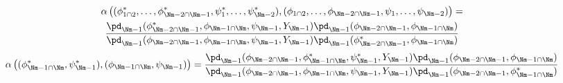 \begin{multline}
  \alpha\left(
    (\phi_{1 \cap 2}^{*}, \ldots, \phi_{\Nm - 2 \cap \Nm - 1}^{*}, \psi_{1}^{*}, \ldots, \psi_{\Nm - 2}^{*}),
    (\phi_{1 \cap 2}, \ldots, \phi_{\Nm - 2 \cap \Nm - 1}, \psi_{1}, \ldots, \psi_{\Nm - 2})
  \right)
  = \\
  \frac {
    \pd_{\Nm - 1}(\phi_{\Nm - 2 \cap \Nm - 1}^{*}, \phi_{\Nm - 1 \cap \Nm}, \psi_{\Nm - 1}, Y_{\Nm - 1})
    \pd_{\Nm - 1}(\phi_{\Nm - 2 \cap \Nm - 1}, \phi_{\Nm - 1 \cap \Nm})
  } {
    \pd_{\Nm - 1}(\phi_{\Nm - 2 \cap \Nm - 1}, \phi_{\Nm - 1 \cap \Nm}, \psi_{\Nm - 1}, Y_{\Nm - 1})
    \pd_{\Nm - 1}(\phi_{\Nm - 2 \cap \Nm - 1}^{*}, \phi_{\Nm - 1 \cap \Nm})
  } 
  \end{multline}
  \begin{multline}
  \alpha\left(
    (\phi_{\Nm - 1 \cap \Nm}^{*}, \psi_{\Nm - 1}^{*}),
    (\phi_{\Nm - 1 \cap \Nm}, \psi_{\Nm - 1})
  \right)
  = 
  \frac {
    \pd_{\Nm - 1}(\phi_{\Nm - 2 \cap \Nm - 1}, \phi_{\Nm - 1 \cap \Nm}^{*}, \psi_{\Nm - 1}^{*}, Y_{\Nm - 1})
    \pd_{\Nm - 1}(\phi_{\Nm - 2 \cap \Nm - 1}, \phi_{\Nm - 1 \cap \Nm})
  } {
    \pd_{\Nm - 1}(\phi_{\Nm - 2 \cap \Nm - 1}, \phi_{\Nm - 1 \cap \Nm}, \psi_{\Nm - 1}, Y_{\Nm - 1})
    \pd_{\Nm - 1}(\phi_{\Nm - 2 \cap \Nm - 1}, \phi_{\Nm - 1 \cap \Nm}^{*})
  } 
\end{multline}